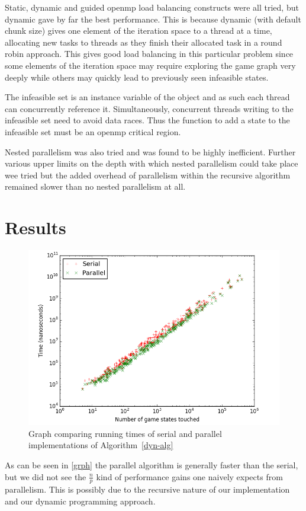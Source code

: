 \documentclass[12pt,a4paper]{report}
\begin{document}
Static, dynamic and guided openmp load balancing constructs were all tried, but dynamic gave by far the best performance. This is because dynamic (with default chunk size) gives one element of the iteration space to a thread at a time, allocating new tasks to threads as they finish their allocated task in a round robin approach. This gives good load balancing in this particular problem since some elements of the iteration space may require exploring the game graph very deeply while others may quickly lead to previously seen infeasible states.

The infeasible set is an instance variable of the object and as such each thread can concurrently reference it. Simultaneously, concurrent threads writing to the infeasible set need to avoid data races. Thus the function to add a state to the infeasible set must be an openmp critical region.

Nested parallelism was also tried and was found to be highly inefficient. Further various upper limits on the depth with which nested parallelism could take place wee tried but the added overhead of parallelism within the recursive algorithm remained slower than no nested parallelism at all.

\pagebreak

\section*{Results}
\graphicspath{ {TestData/} }
\begin{figure}[ht]
  \includegraphics[width=\linewidth]{better_graph2}
  \caption{Graph comparing running times of serial and parallel implementations of Algorithm~\ref{dyn-alg}}
  \label{grph}
\end{figure}
As can be seen in \autoref{grph} the parallel algorithm is generally faster than the serial, but we did not see the $\frac{n}{p}$ kind of performance gains one naively expects from parallelism. This is possibly due to the recursive nature of our implementation and our dynamic programming approach.
\end{document}

